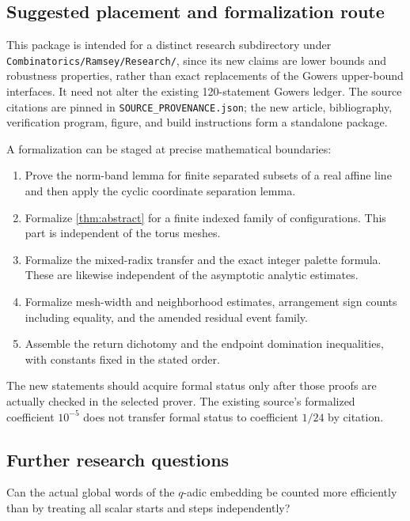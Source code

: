 \subsection{Suggested placement and formalization route}

This package is intended for a distinct research subdirectory under
\texttt{Combinatorics/}\allowbreak\texttt{Ramsey/}\allowbreak\texttt{Research/},
since its new claims are lower
bounds and robustness properties, rather than exact replacements of
the Gowers upper-bound interfaces.
It need not alter the existing 120-statement Gowers ledger.
The source citations are pinned in \texttt{SOURCE\_PROVENANCE.json};
the new article, bibliography, verification program, figure, and build
instructions form a standalone package.

A formalization can be staged at precise mathematical boundaries:
\begin{enumerate}
 \item Prove the norm-band lemma for finite separated subsets of a
       real affine line and then apply the cyclic coordinate
       separation lemma.
 \item Formalize \cref{thm:abstract} for a finite indexed family of
       configurations. This part is independent of the torus meshes.
 \item Formalize the mixed-radix transfer and the exact integer
       palette formula. These are likewise independent of the
       asymptotic analytic estimates.
 \item Formalize mesh-width and neighborhood estimates, arrangement
       sign counts including equality, and the amended residual
       event family.
 \item Assemble the return dichotomy and the endpoint domination
       inequalities, with constants fixed in the stated order.
\end{enumerate}
The new statements should acquire formal status only after those proofs
are actually checked in the selected prover. The existing source's
formalized coefficient \(10^{-5}\) does not transfer formal status to
coefficient \(1/24\) by citation.

\subsection{Further research questions}

\begin{question}\label{q:global}
Can the actual global words of the \(q\)-adic embedding be counted
more efficiently than by treating all scalar starts and steps
independently?
\end{question}

